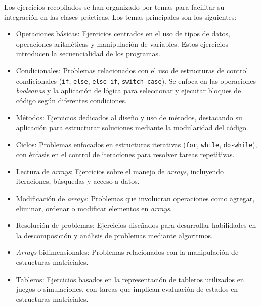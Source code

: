Los ejercicios recopilados se han organizado por temas para facilitar su integración en las clases prácticas. Los temas principales son los siguientes: 

\begin{itemize}  
    \item Operaciones básicas:  
    Ejercicios centrados en el uso de tipos de datos, operaciones aritméticas y manipulación de variables. Estos ejercicios introducen la secuencialidad de los programas.  

    \item Condicionales:  
    Problemas relacionados con el uso de estructuras de control condicionales (\texttt{if}, \texttt{else}, \texttt{else if}, \texttt{switch case}). Se enfoca en las operaciones \textit{booleanas} y la aplicación de lógica para seleccionar y ejecutar bloques de código según diferentes condiciones.

    \item Métodos:
    Ejercicios dedicados al diseño y uso de métodos, destacando su aplicación para estructurar soluciones mediante la modularidad del código.  

    \item Ciclos:  
    Problemas enfocados en estructuras iterativas (\texttt{for}, \texttt{while}, \texttt{do-while}), con énfasis en el control de iteraciones para resolver tareas repetitivas.

    \item Lectura de \textit{arrays}:  
    Ejercicios sobre el manejo de \textit{arrays}, incluyendo iteraciones, búsquedas y acceso a datos.  

    \item Modificación de \textit{arrays}:  
    Problemas que involucran operaciones como agregar, eliminar, ordenar o modificar elementos en \textit{arrays}.  

    \item Resolución de problemas:  
    Ejercicios diseñados para desarrollar habilidades en la descomposición y análisis de problemas mediante algoritmos.

    \item \textit{Arrays} bidimensionales:  
    Problemas relacionados con la manipulación de estructuras matriciales.  

    \item Tableros:  
    Ejercicios basados en la representación de tableros utilizados en juegos o simulaciones, con tareas que implican evaluación de estados en estructuras matriciales.
\end{itemize}  

